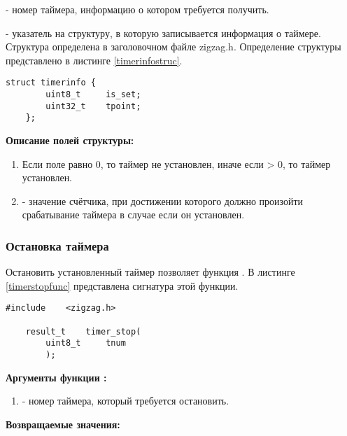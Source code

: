 \begin{enumerate}
{\itshape
\item {} - номер таймера, информацию о котором требуется получить.
\item {} - указатель на структуру, в которую записывается информация о таймере. Структура определена в заголовочном
файле zigzag.h. Определение структуры представлено в листинге \ref{timerinfostruc}.
}

\begin{lstlisting}[caption=Определение структуры \myarg{timerinfo}, label=timerinfostruc]
    struct timerinfo {
        uint8_t     is_set;
        uint32_t    tpoint;
    };
\end{lstlisting}

{\bfseries Описание полей структуры:}

{\itshape
\begin{enumerate}
\item {} Если поле равно 0, то таймер не установлен, иначе если  > 0, то таймер установлен.
\item {} - значение счётчика, при достижении которого должно произойти срабатывание таймера в случае если он установлен.
\end{enumerate}
}
\end{enumerate}

\subsubsection{Остановка таймера}

    Остановить установленный таймер позволяет функция .
В листинге \ref{timerstopfunc} представлена сигнатура этой функции.

\begin{lstlisting}[caption=\myfunc{timer\_stop()} - остановка таймера, label=timerstopfunc ]
    #include    <zigzag.h>

    result_t    timer_stop(
        uint8_t     tnum
        );
\end{lstlisting}

{\bfseries Аргументы функции :}

{\itshape
\begin{enumerate}
\item {} - номер таймера, который требуется остановить.
\end{enumerate}
}

{\bfseries Возвращаемые значения:}

